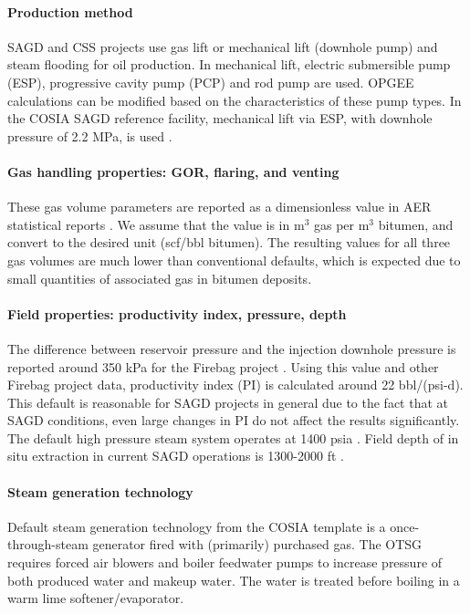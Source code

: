 \documentclass[11pt]{report}
\begin{document}
\paragraph{Production method}
SAGD and CSS projects use gas lift or mechanical lift (downhole pump) and steam flooding for oil production. In mechanical lift, electric submersible pump (ESP), progressive cavity pump (PCP) and rod pump are used. OPGEE calculations can be modified based on the characteristics of these pump types.
In the COSIA SAGD reference facility, mechanical lift via ESP, with downhole pressure of 2.2 MPa, is used \cite{COSIA2014}.

\paragraph{Gas handling properties: GOR, flaring, and venting}
These gas volume parameters are reported as a dimensionless value in AER statistical reports \cite{AERvar}. We assume that the value is in m$^3$ gas per m$^3$ bitumen, and convert to the desired unit (scf/bbl bitumen). The resulting values for all three gas volumes are much lower than conventional defaults, which is expected due to small quantities of associated gas in bitumen deposits.

\paragraph{Field properties: productivity index, pressure, depth}
The difference between reservoir pressure and the injection downhole pressure is reported around 350 kPa for the Firebag project \cite{AERvarISPP}. Using this value and other Firebag project data, productivity index (PI) is calculated around 22 bbl/(psi-d). This default is reasonable for SAGD projects in general due to the fact that at SAGD conditions, even large changes in PI do not affect the results significantly.   The default high pressure steam system operates at 1400 psia \cite{COSIA2014}.  Field depth of in situ extraction in current SAGD operations is 1300-2000 ft \cite{COSIA2014}.

\paragraph{Steam generation technology}
Default steam generation technology from the COSIA template is a once-through-steam generator fired with (primarily) purchased gas.  The OTSG requires forced air blowers and boiler feedwater pumps to increase pressure of both produced water and makeup water. The water is treated before boiling in a warm lime softener/evaporator.
\end{document}
